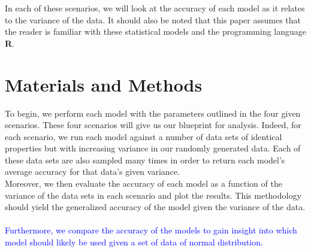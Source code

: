 \documentclass[11pt, oneside]{article}
\begin{document}
In each of these scenarios, we will look at the accuracy of each model as it relates to the variance of the data. It should also be noted that this paper assumes that the reader is familiar with these statistical models and the programming language \textbf\textsf{R}.

\pagebreak




\section*{Materials and Methods}
To begin, we perform each model with the parameters outlined in the four given scenarios. These four scenarios will give us our blueprint for analysis. Indeed, for each scenario, we run each model against a number of data sets of identical properties but with increasing variance in our randomly generated data. Each of these data sets are also sampled many times in order to return each model's average accuracy for that data's given variance.\\
Moreover, we then evaluate the accuracy of each model as a function of the variance of the data sets in each scenario and plot the results. This methodology should yield the generalized accuracy of the model given the variance of the data.\\
\\
\textcolor{blue}{Furthermore, we compare the accuracy of the models to gain insight into which model should likely be used given a set of data of normal distribution.}
 
\end{document}
